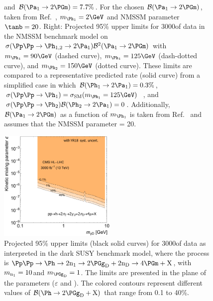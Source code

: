 \begin{figure}
{and $\mathcal{B}(\PaOne \to 2\PGm) = 7.7\%$. For the chosen $\mathcal{B}(\PaOne \to 2\PGm)$, taken from Ref.~\cite{Dermisek:2010mg}, $\MPhOne = 2\GeV$ and NMSSM parameter $\tanb = 20$. Right: Projected 95\% \CL upper limits for 3000\fbinv of data in the NMSSM benchmark model on $\sigma(\Pp\Pp \to \PhOneTwo \to 2 \PaOne) \mathcal{B}^2(\PaOne \to 2 \PGm)$ with $\MPhOne=90\GeV$ (dashed curve),
$\MPhOne=125\GeV$ (dash-dotted curve), and $\MPhTwo=150\GeV$ (dotted curve). These limits are compared to a representative predicted rate (solid curve) from a simplified case in which $\mathcal{B}(\PhOne \to 2 \PaOne) = 0.3\%$,
$\sigma (\Pp\Pp \to \PhOne)=\sigma_\mathrm{SM}(\MPhOne = 125\GeV)$~\cite{Dittmaier:2011ti}, and
$\sigma (\Pp\Pp \to \PhTwo)  \mathcal{B}(\PhTwo \to 2 \PaOne) = 0$. Additionally, $\mathcal{B}(\PaOne \to 2\PGm)$
as a function of $\MPhOne$ is taken from Ref.~\cite{Dermisek:2010mg} and assumes that the NMSSM parameter \tanb = 20.}
\label{fig:my_label2}
\end{figure}

\begin{figure}
\centering
\includegraphics[width=0.5\textwidth]{plots/darksusy_plots_scenario_2/Limit_DarkPhoton_Epsilon_vs_mass_FTR_scenario2.pdf}%
\caption{Projected 95\% \CL upper limits (black solid curves) for 3000\fbinv of data as interpreted in the dark SUSY benchmark model, where the process is $\Pp\Pp \to \Ph \to 2\nOne \to 2\gammaDark+2\nDark \to  4\PGm+\PX$, with $m_{\textnormal{n}_{1}}=10$\GeV and $\MgammaDark=1$\GeV.
The limits are presented in the plane of the parameters ($\varepsilon$ and \MgammaDark). The colored contours represent different values of $\mathcal{B}(\Ph \to 2\gammaDark + \PX)$ that range from 0.1 to 40\%. }
\label{fig:my_label4}
\end{figure}


